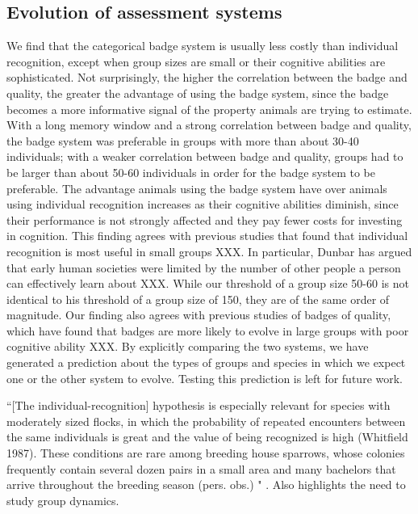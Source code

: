 \subsection*{Evolution of assessment systems} %

We find that the categorical badge system is usually less costly than individual recognition, except when group sizes are small or their cognitive abilities are sophisticated. Not surprisingly, the higher the correlation between the badge and quality, the greater the advantage of using the badge system, since the badge becomes a more informative signal of the property animals are trying to estimate. With a long memory window and a strong correlation between badge and quality, the badge system was preferable in groups with more than about 30-40 individuals; with a weaker correlation between badge and quality, groups had to be larger than about 50-60 individuals in order for the badge system to be preferable. The advantage animals using the badge system have over animals using individual recognition increases as their cognitive abilities diminish, since their performance is not strongly affected and they pay fewer costs for investing in cognition. This finding agrees with previous studies that found that individual recognition is most useful in small groups XXX. In particular, Dunbar has argued that early human societies were limited by the number of other people a person can effectively learn about XXX. While our threshold of a group size 50-60 is not identical to his threshold of a group size of 150, they are of the same order of magnitude. Our finding also agrees with previous studies of badges of quality, which have found that badges are more likely to evolve in large groups with poor cognitive ability XXX. By explicitly comparing the two systems, we have generated a prediction about the types of groups and species in which we expect one or the other system to evolve. Testing this prediction is left for future work. 


``[The individual-recognition] hypothesis is especially relevant for species with moderately sized flocks, in which the probability of repeated encounters between the same individuals is great and the value of being recognized is high (Whitfield 1987). These conditions are rare among breeding house sparrows, whose colonies frequently contain several dozen pairs in a small area and many bachelors that arrive throughout the breeding season (pers. obs.) " \cite{Veiga:1993fk}. Also highlights the need to study group dynamics.


